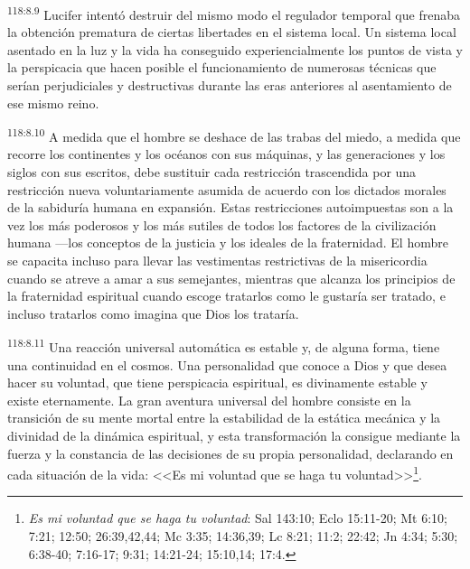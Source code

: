 \documentclass[twoside, 11pt]{book}
\begin{document}
\par
\textsuperscript{118:8.9} Lucifer intentó destruir del mismo modo el regulador temporal que frenaba la obtención prematura de ciertas libertades en el sistema local. Un sistema local asentado en la luz y la vida ha conseguido experiencialmente los puntos de vista y la perspicacia que hacen posible el funcionamiento de numerosas técnicas que serían perjudiciales y destructivas durante las eras anteriores al asentamiento de ese mismo reino.

\par
\textsuperscript{118:8.10} A medida que el hombre se deshace de las trabas del miedo, a medida que recorre los continentes y los océanos con sus máquinas, y las generaciones y los siglos con sus escritos, debe sustituir cada restricción trascendida por una restricción nueva voluntariamente asumida de acuerdo con los dictados morales de la sabiduría humana en expansión. Estas restricciones autoimpuestas son a la vez los más poderosos y los más sutiles de todos los factores de la civilización humana ---los conceptos de la justicia y los ideales de la fraternidad. El hombre se capacita incluso para llevar las vestimentas restrictivas de la misericordia cuando se atreve a amar a sus semejantes, mientras que alcanza los principios de la fraternidad espiritual cuando escoge tratarlos como le gustaría ser tratado, e incluso tratarlos como imagina que Dios los trataría.

\par
\textsuperscript{118:8.11} Una reacción universal automática es estable y, de alguna forma, tiene una continuidad en el cosmos. Una personalidad que conoce a Dios y que desea hacer su voluntad, que tiene perspicacia espiritual, es divinamente estable y existe eternamente. La gran aventura universal del hombre consiste en la transición de su mente mortal entre la estabilidad de la estática mecánica y la divinidad de la dinámica espiritual, y esta transformación la consigue mediante la fuerza y la constancia de las decisiones de su propia personalidad, declarando en cada situación de la vida: <<Es mi voluntad que se haga tu voluntad>>\footnote{\textit{Es mi voluntad que se haga tu voluntad}: Sal 143:10; Eclo 15:11-20; Mt 6:10; 7:21; 12:50; 26:39,42,44; Mc 3:35; 14:36,39; Lc 8:21; 11:2; 22:42; Jn 4:34; 5:30; 6:38-40; 7:16-17; 9:31; 14:21-24; 15:10,14; 17:4.}.
\end{document}
